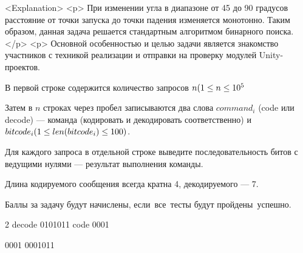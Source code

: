 <Explanation>
  <p>
    При изменении угла в диапазоне от 45 до 90 градусов расстояние от точки запуска
    до точки падения изменяется монотонно. Таким образом, данная задача
    решается стандартным алгоритмом бинарного поиска.
  </p>
  <p>
    Основной особенностью и целью задачи является знакомство участников с техникой
    реализации и отправки на проверку модулей Unity-проектов.

    

В первой строке содержится количество запросов $n\space (1\leq n \leq 10^5 $

Затем в $n$ строках через пробел записываются два слова $command_i$ (code или decode) — команда (кодировать и декодировать соответственно) и $ bitcode_i\space (1\leq len(bitcode_i) \leq 100)$.

\outputfmtSection

Для каждого запроса в отдельной строке выведите последовательность битов с ведущими нулями — результат выполнения команды.

\explanationSection

Длина кодируемого сообщения всегда кратна 4, декодируемого — 7.

\markSection

Баллы за задачу будут начислены, если все тесты будут пройдены успешно.


\begin{myverbbox}[\small]{\vinput}
    2
    decode 0101011
    code 0001
\end{myverbbox}
\begin{myverbbox}[\small]{\voutput}
    0001
    0001011
\end{myverbbox}

